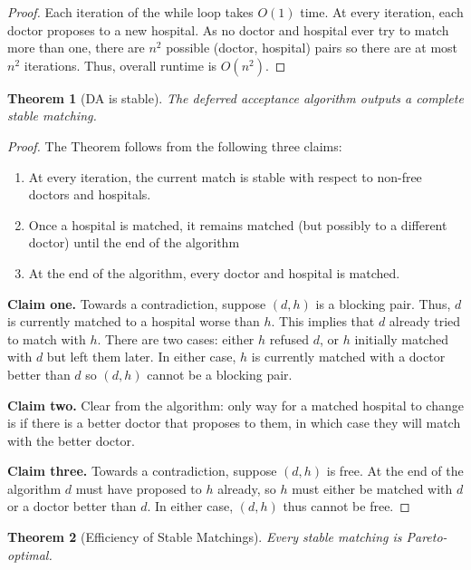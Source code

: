 \documentclass[dvipsnames]{article}
\newtheorem{theorem}{Theorem}[section]
\theoremstyle{definition}
\theoremstyle{remark}
\begin{document}
\begin{proof}
	Each iteration of the while loop takes $O(1)$ time. At every iteration, each doctor proposes to a new hospital. As no doctor and hospital ever try to match more than one, there are $n^2$ possible (doctor, hospital) pairs so there are at most $n^2$ iterations. Thus, overall runtime is $O(n^2)$.
\end{proof}

\begin{theorem}[DA is stable]
	The deferred acceptance algorithm outputs a complete stable matching.
\end{theorem}


\begin{proof}
	The Theorem follows from the following three claims:
	\begin{enumerate}
		\item At every iteration, the current match is stable with respect to non-free doctors and hospitals.
		\item Once a hospital is matched, it remains matched (but possibly to a different doctor) until the end of the algorithm
		\item At the end of the algorithm, every doctor and hospital is matched. 
	\end{enumerate}

	\textbf{Claim one.} Towards a contradiction, suppose $(d,h)$ is a blocking pair. Thus, $d$ is currently matched to a hospital worse than $h$. This implies that $d$ already tried to match with $h$. There are two cases: either $h$ refused $d$, or $h$ initially matched with $d$ but left them later. In either case, $h$ is currently matched with a doctor better than $d$ so $(d,h)$ cannot be a blocking pair.
	
	\textbf{Claim two.} Clear from the algorithm: only way for a matched hospital to change is if there is a better doctor that proposes to them, in which case they will match with the better doctor.
	
	\textbf{Claim three.} Towards a contradiction, suppose $(d,h)$ is free. At the end of the algorithm $d$ must have proposed to $h$ already, so $h$ must either be matched with $d$ or a doctor better than $d$. In either case, $(d,h)$ thus cannot be free.
\end{proof}

\begin{theorem}[Efficiency of Stable Matchings]
	Every stable matching is Pareto-optimal. 
\end{theorem}
\end{document}
